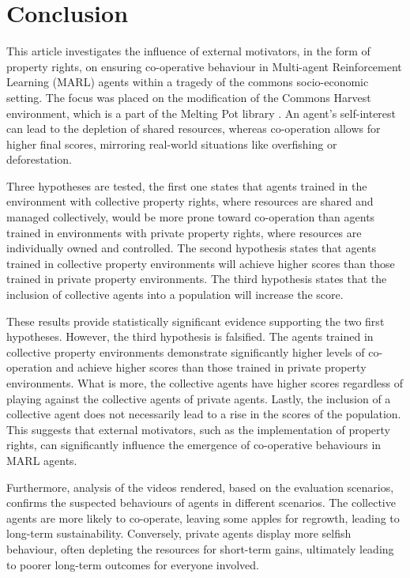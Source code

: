 \documentclass[preprint,12pt,authoryear]{elsarticle}
\begin{document}
\section{Conclusion}


This article investigates the influence of external motivators, in the form of property rights, on ensuring co-operative behaviour in Multi-agent Reinforcement Learning (MARL) agents within a tragedy of the commons socio-economic setting. The focus was placed on the modification of the Commons Harvest environment, which is a part of the Melting Pot library \citep{Leibo2021, agapiou2023meltingpot20}. An agent's self-interest can lead to the depletion of shared resources, whereas co-operation allows for higher final scores, mirroring real-world situations like overfishing or deforestation.


Three hypotheses are tested, the first one states that agents trained in the environment with collective property rights, where resources are shared and managed collectively, would be more prone toward co-operation than agents trained in environments with private property rights, where resources are individually owned and controlled. The second hypothesis states that agents trained in collective property environments will achieve higher scores than those trained in private property environments. The third hypothesis states that the inclusion of collective agents into a population will increase the score.

These results provide statistically significant evidence supporting the two first hypotheses. However, the third hypothesis is falsified. The agents trained in collective property environments demonstrate significantly higher levels of co-operation and achieve higher scores than those trained in private property environments. What is more, the collective agents have higher scores regardless of playing against the collective agents of private agents. Lastly, the inclusion of a collective agent does not necessarily lead to a rise in the scores of the population. This suggests that external motivators, such as the implementation of property rights, can significantly influence the emergence of co-operative behaviours in MARL agents.


Furthermore, analysis of the videos rendered, based on the evaluation scenarios, confirms the suspected behaviours of agents in different scenarios. The collective agents are more likely to co-operate, leaving some apples for regrowth, leading to long-term sustainability. Conversely, private agents display more selfish behaviour, often depleting the resources for short-term gains, ultimately leading to poorer long-term outcomes for everyone involved. 
\end{document}
